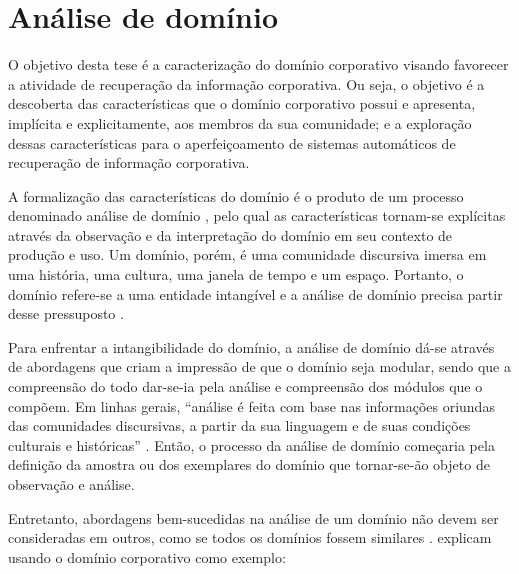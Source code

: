 

\section{Análise de domínio}


O objetivo desta tese é a caracterização do domínio corporativo visando favorecer a atividade de recuperação da informação corporativa. Ou seja, o objetivo é a descoberta das características que o domínio corporativo possui e apresenta, implícita e explicitamente, aos membros da sua comunidade; e a exploração dessas características para o aperfeiçoamento de sistemas automáticos de recuperação de informação corporativa.

A formalização das características do domínio é o produto de um processo denominado análise de domínio \cite{alvarenga12}, pelo qual as características tornam-se explícitas através da observação e da interpretação do domínio em seu contexto de produção e uso. Um domínio, porém, é uma comunidade discursiva imersa em uma história, uma cultura, uma janela de tempo e um espaço. Portanto, o domínio refere-se a uma entidade intangível e a análise de domínio precisa partir desse pressuposto \cite{domainAnalysis1995}.

Para enfrentar a intangibilidade do domínio, a análise de domínio dá-se através de abordagens que criam a impressão de que o domínio seja modular, sendo que a compreensão do todo dar-se-ia pela análise e compreensão dos módulos que o compõem. Em linhas gerais, ``análise é feita com base nas informações oriundas das comunidades discursivas, a partir da sua linguagem e de suas condições culturais e históricas'' \cite[p. 182]{dias11}. Então, o processo da análise de domínio começaria pela definição da amostra ou dos exemplares do domínio que tornar-se-ão objeto de observação e análise. 

Entretanto, abordagens bem-sucedidas na análise de um domínio não devem ser consideradas em outros, como se todos os domínios fossem similares \cite{hjorland2002domain}.  explicam usando o domínio corporativo como exemplo:

